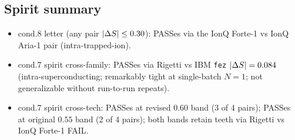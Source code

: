 \subsection{Spirit summary}

\begin{itemize}
\item cond.8 letter (any pair $\lvert\Delta S\rvert \le 0.30$): PASSes via the IonQ
  Forte-1 vs IonQ Aria-1 pair (intra-trapped-ion).
\item cond.7 spirit cross-family: PASSes via Rigetti vs IBM
  \texttt{fez} $\lvert\Delta S\rvert = 0.084$ (intra-superconducting; remarkably tight
  at single-batch $N = 1$; not generalizable without run-to-run
  repeats).
\item cond.7 spirit cross-tech: PASSes at revised $0.60$ band
  (3 of 4 pairs); PASSes at original $0.55$ band (2 of 4 pairs);
  both bands retain teeth via Rigetti vs IonQ Forte-1 FAIL.
\end{itemize}

